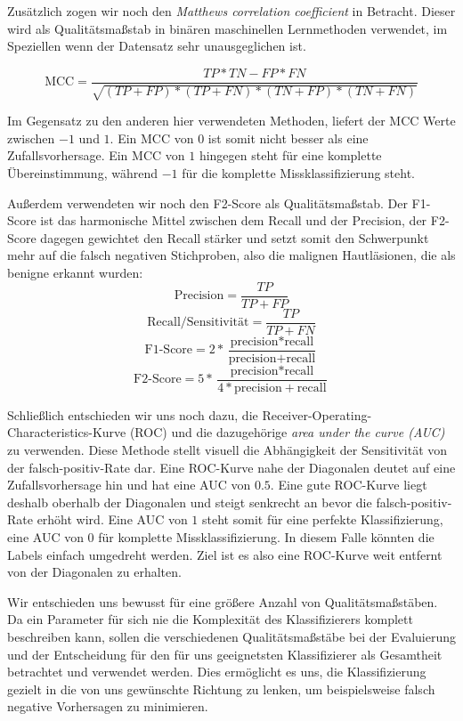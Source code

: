 Zusätzlich zogen wir noch den \textit{Matthews correlation coefficient} in Betracht. Dieser wird als Qualitätsmaßstab in binären maschinellen Lernmethoden verwendet, im Speziellen wenn der Datensatz sehr unausgeglichen ist. 

\[\text{MCC} = \frac{TP*TN - FP*FN}{\sqrt{(TP+FP)*(TP+FN)*(TN+FP)*(TN+FN)}}\]

Im Gegensatz zu den anderen hier verwendeten Methoden, liefert der MCC Werte zwischen $-1$ und $1$. Ein MCC von $0$ ist somit nicht besser als eine Zufallsvorhersage. Ein MCC von $1$ hingegen steht für eine komplette Übereinstimmung, während $-1$ für die komplette Missklassifizierung steht.

Außerdem verwendeten wir noch den F2-Score als Qualitätsmaßstab. Der F1-Score ist das harmonische Mittel zwischen dem Recall und der Precision, der F2-Score dagegen gewichtet den Recall stärker und setzt somit den Schwerpunkt mehr auf die falsch negativen Stichproben, also die malignen Hautläsionen, die als benigne erkannt wurden:
	\[\text{Precision} = \frac{TP}{TP+FP}\]
    \[\text{Recall/Sensitivität} = \frac{TP}{TP+FN}\]
	\[\text{F1-Score} = 2*\frac{\text{precision}*\text{recall}}	{\text{precision}+\text{recall}}\]
   	\[\text{F2-Score} = 5*\frac{\text{precision}*\text{recall}}	{4*\text{precision}+\text{recall}}\]
    
Schließlich entschieden wir uns noch dazu, die Receiver-Operating-Characteristics-Kurve (ROC) und die dazugehörige \textit{area under the curve (AUC)} zu verwenden. Diese Methode stellt visuell die Abhängigkeit der Sensitivität von der falsch-positiv-Rate dar. Eine ROC-Kurve nahe der Diagonalen deutet auf eine Zufallsvorhersage hin und hat eine AUC von $0.5$. Eine gute ROC-Kurve liegt deshalb oberhalb der Diagonalen und steigt senkrecht an bevor die falsch-positiv-Rate erhöht wird. Eine AUC von $1$ steht somit für eine perfekte Klassifizierung, eine AUC von $0$ für komplette Missklassifizierung. In diesem Falle könnten die Labels einfach umgedreht werden. Ziel ist es also eine ROC-Kurve weit entfernt von der Diagonalen zu erhalten.
    
Wir entschieden uns bewusst für eine größere Anzahl von Qualitätsmaßstäben. Da ein Parameter für sich nie die Komplexität des Klassifizierers komplett beschreiben kann, sollen die verschiedenen Qualitätsmaßstäbe bei der Evaluierung und der Entscheidung für den für uns geeignetsten Klassifizierer als Gesamtheit betrachtet und verwendet werden. Dies ermöglicht es uns, die Klassifizierung gezielt in die von uns gewünschte Richtung zu lenken, um beispielsweise falsch negative Vorhersagen zu minimieren.

